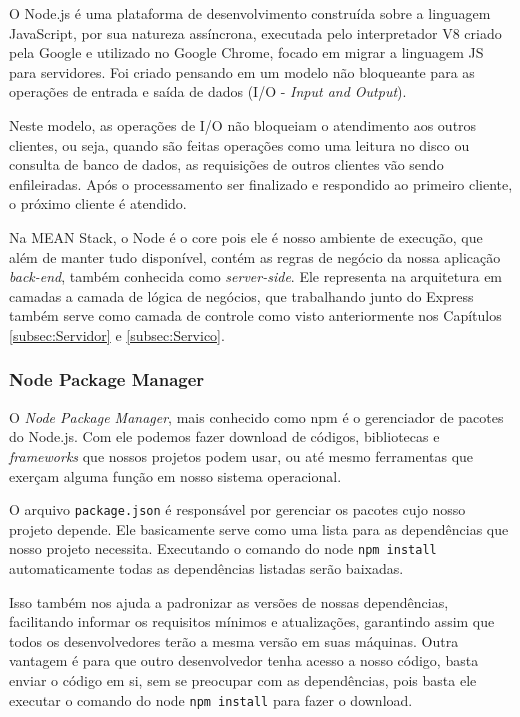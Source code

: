\documentclass[
	12pt,				%
	openright,			%
	twoside,			%
	a4paper,			%
	english,			%
	brazil				%
	]{abntex2}
\begin{document}
O Node.js é uma plataforma de desenvolvimento construída sobre a linguagem JavaScript, por sua natureza assíncrona, executada pelo interpretador V8 criado pela Google e utilizado no Google Chrome, focado em migrar a linguagem JS para servidores. Foi criado pensando em um modelo não bloqueante para as operações de entrada e saída de dados (I/O - \textit{Input and Output}).

Neste modelo, as operações de I/O não bloqueiam o atendimento aos outros clientes, ou seja, quando são feitas operações como uma leitura no disco ou consulta de banco de dados, as requisições de outros clientes vão sendo enfileiradas. Após o processamento ser finalizado e respondido ao primeiro cliente, o próximo cliente é atendido.

Na MEAN Stack, o Node é o core pois ele é nosso ambiente de execução, que além de manter tudo disponível, contém as regras de negócio da nossa aplicação \textit{back-end}, também conhecida como \textit{server-side}. Ele representa na arquitetura em camadas a camada de lógica de negócios, que trabalhando junto do Express também serve como camada de controle como visto anteriormente nos Capítulos \ref{subsec:Servidor} e \ref{subsec:Servico}.

\subsubsection{Node Package Manager}

O \textit{Node Package Manager}, mais conhecido como npm é o gerenciador de pacotes do Node.js. Com ele podemos fazer download de códigos, bibliotecas e \textit{frameworks} que nossos projetos podem usar, ou até mesmo ferramentas que exerçam alguma função em nosso sistema operacional.

O arquivo \verb|package.json| é responsável por gerenciar os pacotes cujo nosso projeto depende. Ele basicamente serve como uma lista para as dependências que nosso projeto necessita. Executando o comando do node \verb|npm install| automaticamente todas as dependências listadas serão baixadas.

Isso também nos ajuda a padronizar as versões de nossas dependências, facilitando informar os requisitos mínimos e atualizações, garantindo assim que todos os desenvolvedores terão a mesma versão em suas máquinas. Outra vantagem é para que outro desenvolvedor tenha acesso a nosso código, basta enviar o código em si, sem se preocupar com as dependências, pois basta ele executar o comando do node \verb|npm install| para fazer o download.
\end{document}
